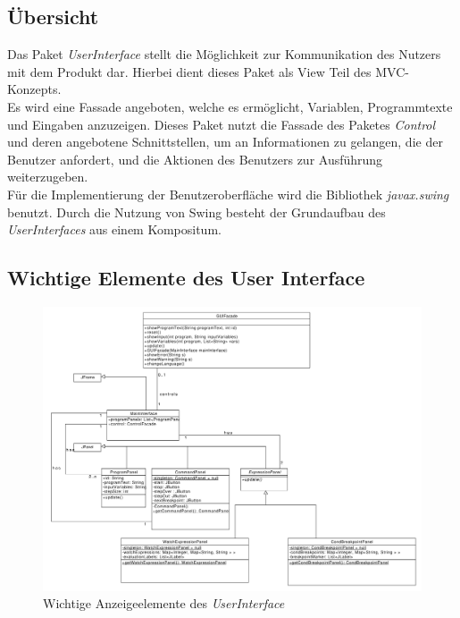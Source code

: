 \documentclass[parskip=full]{scrartcl}
\begin{document}
\subsection{Übersicht}
Das Paket \textit{UserInterface} stellt die Möglichkeit zur Kommunikation des Nutzers mit dem Produkt dar. Hierbei dient dieses Paket als View Teil des MVC-Konzepts. \\
Es wird eine Fassade angeboten, welche es ermöglicht, Variablen, Programmtexte und Eingaben anzuzeigen. Dieses Paket nutzt die Fassade des Paketes \textit{Control} und deren angebotene Schnittstellen, um an Informationen zu gelangen, die der Benutzer anfordert, und die Aktionen des Benutzers zur Ausführung weiterzugeben. \\
Für die Implementierung der Benutzeroberfläche wird die Bibliothek \textit{javax.swing} benutzt. Durch die Nutzung von Swing besteht der Grundaufbau des \textit{UserInterfaces} aus einem Kompositum.
\subsection{Wichtige Elemente des User Interface}
\begin{figure}[!h]
\centering
\includegraphics[width=1.1\textwidth]{diagrammIdeenUmlet/GUIOverview.pdf}
\caption{Wichtige Anzeigeelemente des \textit{UserInterface}}
\label{GUIOverview}
\end{figure}
\end{document}
